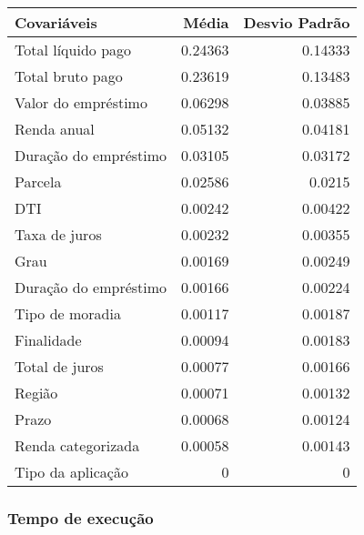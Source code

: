 \begin{table}[H]
\centering
\begin{tabular}{lrr}
  \hline
  Covariáveis               &   Média &   Desvio Padrão \\
  \hline
   Total líquido pago    & 0.24363 &         0.14333 \\
   Total bruto pago      & 0.23619 &         0.13483 \\
   Valor do empréstimo   & 0.06298 &         0.03885 \\
   Renda anual           & 0.05132 &         0.04181 \\
   Duração do empréstimo & 0.03105 &         0.03172 \\
   Parcela               & 0.02586 &         0.0215  \\
   DTI                   & 0.00242 &         0.00422 \\
   Taxa de juros         & 0.00232 &         0.00355 \\
   Grau                  & 0.00169 &         0.00249 \\
   Duração do empréstimo & 0.00166 &         0.00224 \\
   Tipo de moradia       & 0.00117 &         0.00187 \\
   Finalidade            & 0.00094 &         0.00183 \\
   Total de juros        & 0.00077 &         0.00166 \\
   Região                & 0.00071 &         0.00132 \\
   Prazo                 & 0.00068 &         0.00124 \\
   Renda categorizada    & 0.00058 &         0.00143 \\
   Tipo da aplicação     & 0       &         0       \\
  \hline
  \end{tabular}
\end{table}

\subsubsection{Tempo de execução}

